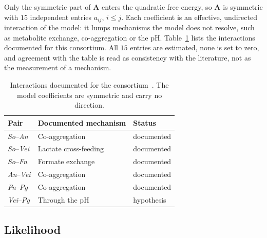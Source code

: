 Only the symmetric part of $\mathbf{A}$ enters the quadratic free energy, so
$\mathbf{A}$ is symmetric with $15$ independent entries $a_{ij}$, $i\le j$. Each
coefficient is an effective, undirected interaction of the model: it lumps
mechanisms the model does not resolve, such as metabolite exchange,
co-aggregation or the pH. Table~\ref{tab:heine_network} lists the interactions
documented for this consortium. All $15$ entries are estimated, none is set to
zero, and agreement with the table is read as consistency with the literature,
not as the measurement of a mechanism.

\begin{table}[htbp]
  \centering\small
  \begin{tabular}{@{}lll@{}}
    \toprule
    \textbf{Pair} & \textbf{Documented mechanism} & \textbf{Status}\\
    \midrule
    \textit{So}--\textit{An}  & Co-aggregation        & documented\\
    \textit{So}--\textit{Vei} & Lactate cross-feeding & documented\\
    \textit{So}--\textit{Fn}  & Formate exchange      & documented\\
    \textit{An}--\textit{Vei} & Co-aggregation        & documented\\
    \textit{Fn}--\textit{Pg}  & Co-aggregation        & documented\\
    \textit{Vei}--\textit{Pg} & Through the pH        & hypothesis\\
    \bottomrule
  \end{tabular}
  \caption[Documented species interactions]{Interactions documented for the
  consortium~\cite{Heine2025PeriImplant, Kolenbrander2010OralMultispecies}. The
  model coefficients are symmetric and carry no direction.}
  \label{tab:heine_network}
\end{table}

\subsection{Likelihood}
\label{sec:heine_likelihood}

